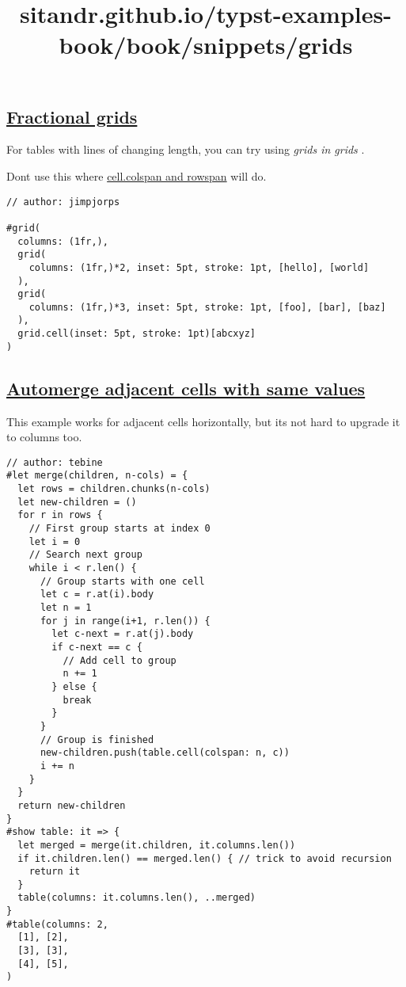 \pandocbounded{}


\title{sitandr.github.io/typst-examples-book/book/snippets/grids}

\subsection{\texorpdfstring{\hyperref[fractional-grids]{Fractional
grids}}{Fractional grids}}\label{fractional-grids}

For tables with lines of changing length, you can try using \emph{grids
in grids} .

Don\textquotesingle t use this where
\href{https://typst.app/docs/reference/model/table/\#definitions-cell-colspan}{cell.colspan
and rowspan} will do.

\begin{verbatim}
// author: jimpjorps

#grid(
  columns: (1fr,),
  grid(
    columns: (1fr,)*2, inset: 5pt, stroke: 1pt, [hello], [world]
  ),
  grid(
    columns: (1fr,)*3, inset: 5pt, stroke: 1pt, [foo], [bar], [baz]
  ),
  grid.cell(inset: 5pt, stroke: 1pt)[abcxyz]
)
\end{verbatim}

\pandocbounded{}

\subsection{\texorpdfstring{\hyperref[automerge-adjacent-cells-with-same-values]{Automerge
adjacent cells with same
values}}{Automerge adjacent cells with same values}}\label{automerge-adjacent-cells-with-same-values}

This example works for adjacent cells horizontally, but
it\textquotesingle s not hard to upgrade it to columns too.

\begin{verbatim}
// author: tebine
#let merge(children, n-cols) = {
  let rows = children.chunks(n-cols)
  let new-children = ()
  for r in rows {
    // First group starts at index 0
    let i = 0 
    // Search next group
    while i < r.len() {
      // Group starts with one cell
      let c = r.at(i).body
      let n = 1
      for j in range(i+1, r.len()) {
        let c-next = r.at(j).body
        if c-next == c {
          // Add cell to group
          n += 1
        } else {
          break
        }
      }
      // Group is finished
      new-children.push(table.cell(colspan: n, c))
      i += n
    }
  }
  return new-children
}
#show table: it => {
  let merged = merge(it.children, it.columns.len())
  if it.children.len() == merged.len() { // trick to avoid recursion
    return it
  }
  table(columns: it.columns.len(), ..merged)
}
#table(columns: 2,
  [1], [2],
  [3], [3],
  [4], [5],
)
\end{verbatim}

